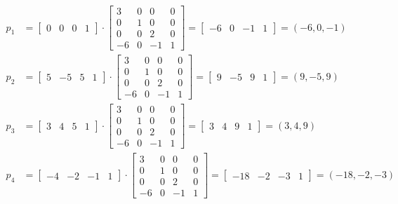 \documentclass[a4paper]{article}
\begin{document}
\begin{align*}
p_1 &= 
\left[
\begin{matrix}
0 & 0 & 0 & 1
\end{matrix}
\right] \cdot
\left[
\begin{matrix}
3 & 0 & 0 & 0\\
0 & 1 & 0 & 0\\
0 & 0 & 2 & 0\\
-6 & 0 & -1 & 1
\end{matrix}
\right] = 
\left[
\begin{matrix}
-6 & 0 & -1 & 1
\end{matrix}
\right] 
=
\left(
-6 , 0 , -1
\right) \\
p_2 &= 
\left[
\begin{matrix}
5 & -5 & 5 & 1
\end{matrix}
\right] \cdot
\left[
\begin{matrix}
3 & 0 & 0 & 0\\
0 & 1 & 0 & 0\\
0 & 0 & 2 & 0\\
-6 & 0 & -1 & 1
\end{matrix}
\right] = 
\left[
\begin{matrix}
9 & -5 & 9 & 1
\end{matrix}
\right] 
=
\left(
9, -5 , 9
\right) \\
p_3 &= 
\left[
\begin{matrix}
3 & 4 & 5 & 1
\end{matrix}
\right] \cdot
\left[
\begin{matrix}
3 & 0 & 0 & 0\\
0 & 1 & 0 & 0\\
0 & 0 & 2 & 0\\
-6 & 0 & -1 & 1
\end{matrix}
\right] = 
\left[
\begin{matrix}
3 & 4 & 9 & 1
\end{matrix}
\right] 
=
\left(
3 , 4 , 9
\right) \\
p_4 &= 
\left[
\begin{matrix}
-4 & -2 & -1 & 1
\end{matrix}
\right] \cdot
\left[
\begin{matrix}
3 & 0 & 0 & 0\\
0 & 1 & 0 & 0\\
0 & 0 & 2 & 0\\
-6 & 0 & -1 & 1
\end{matrix}
\right] 
= 
\left[
\begin{matrix}
-18 & -2 & -3 & 1
\end{matrix}
\right] 
=
\left(
-18 , -2 ,-3
\right) 
\end{align*}
\end{document}
